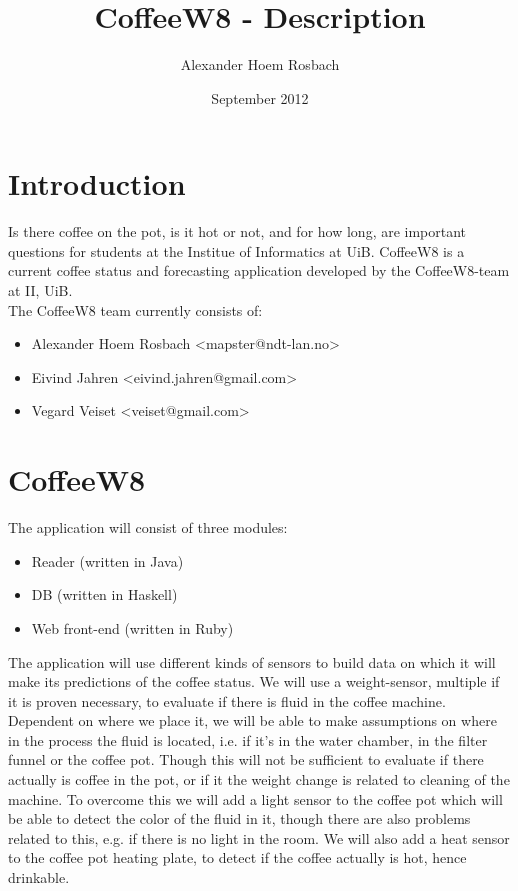 \documentclass[a4paper]{article}
\begin{document}
\title{CoffeeW8 - Description}
\author{Alexander Hoem Rosbach}
\date{September 2012}
\maketitle

\section{Introduction}
Is there coffee on the pot, is it hot or not, and for how long, are important questions for students at the Institue of Informatics at UiB. 
CoffeeW8 is a current coffee status and forecasting application developed by the CoffeeW8-team at II, UiB. \\

The CoffeeW8 team currently consists of:
\begin{itemize}
\item Alexander Hoem Rosbach <mapster@ndt-lan.no>
\item Eivind Jahren <eivind.jahren@gmail.com>
\item Vegard Veiset <veiset@gmail.com>
\end{itemize}

\section{CoffeeW8}
The application will consist of three modules: 
\begin{itemize}
\item Reader (written in Java)
\item DB (written in Haskell)
\item Web front-end (written in Ruby)
\end{itemize}

The application will use different kinds of sensors to build data on which it will make its predictions of the coffee status. We will use a weight-sensor,
multiple if it is proven necessary, to evaluate if there is fluid in the coffee machine. Dependent on where we place it, we will be able to make assumptions on
where in the process the fluid is located, i.e. if it's in the water chamber, in the filter funnel or the coffee pot. Though this will not be sufficient to evaluate
if there actually is coffee in the pot, or if it the weight change is related to cleaning of the machine. To overcome this we will add a light sensor to the coffee 
pot which will be able to detect the color of the fluid in it, though there are also problems related to this, e.g. if there is no light in the room. We will also
add a heat sensor to the coffee pot heating plate, to detect if the coffee actually is hot, hence drinkable. \\
\end{document}
